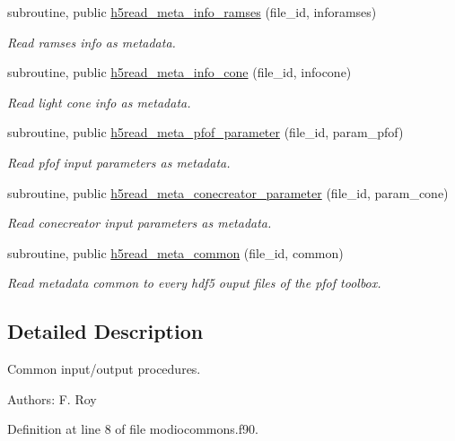 \begin{DoxyCompactItemize}
subroutine, public \hyperlink{classmodiocommons_a1796f14ec35efbff3a4e692077c8bcf8}{h5read\-\_\-meta\-\_\-info\-\_\-ramses} (file\-\_\-id, inforamses)
\begin{DoxyCompactList}\small\item\em Read ramses info as metadata. \end{DoxyCompactList}\item 
subroutine, public \hyperlink{classmodiocommons_a23c194ca7b22b69dcf0bd2ea01b499d2}{h5read\-\_\-meta\-\_\-info\-\_\-cone} (file\-\_\-id, infocone)
\begin{DoxyCompactList}\small\item\em Read light cone info as metadata. \end{DoxyCompactList}\item 
subroutine, public \hyperlink{classmodiocommons_a05a591c82f587de8857aa9749786a9ed}{h5read\-\_\-meta\-\_\-pfof\-\_\-parameter} (file\-\_\-id, param\-\_\-pfof)
\begin{DoxyCompactList}\small\item\em Read pfof input parameters as metadata. \end{DoxyCompactList}\item 
subroutine, public \hyperlink{classmodiocommons_a5c8a5f561313ee8e555927237d405438}{h5read\-\_\-meta\-\_\-conecreator\-\_\-parameter} (file\-\_\-id, param\-\_\-cone)
\begin{DoxyCompactList}\small\item\em Read conecreator input parameters as metadata. \end{DoxyCompactList}\item 
subroutine, public \hyperlink{classmodiocommons_a653750d9160eb5e93a252a8da5aa09d6}{h5read\-\_\-meta\-\_\-common} (file\-\_\-id, common)
\begin{DoxyCompactList}\small\item\em Read metadata common to every hdf5 ouput files of the pfof toolbox. \end{DoxyCompactList}\end{DoxyCompactItemize}


\subsection{Detailed Description}
Common input/output procedures. 

Authors\-: F. Roy 

Definition at line 8 of file modiocommons.\-f90.




